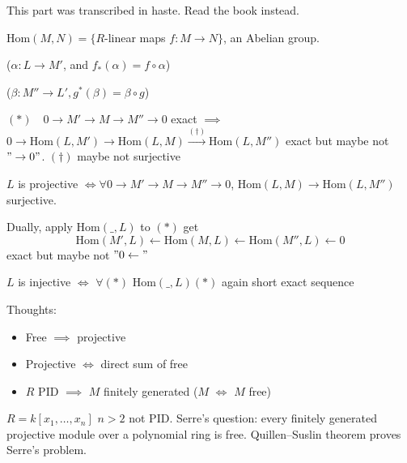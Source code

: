\documentclass{./template}
\newcommand{\Hom}{\textrm{Hom}}
\newcommand\xrsquigarrow[1]{%
    \mathrel{%
        \begin{tikzpicture}[%
            baseline={(current bounding box.south)}
            ]
        \node[%
            ,inner sep=.44ex
            ,align=center
            ] (tmp) {$\scriptstyle #1$};
        \path[%
            ,draw,<-
            ,decorate,decoration={%
                ,zigzag
                ,amplitude=0.7pt
                ,segment length=1.2mm,pre length=3.5pt
                }
            ] 
        (tmp.south east) -- (tmp.south west);
        \end{tikzpicture}
        }
    }
\begin{document}
  \hrulefill

  {\color{red} This part was transcribed in haste. Read the book instead.}

  $\Hom(M,N)=\{ R$-linear maps $f:M\to N\}$, an Abelian group.

  \begin{center}
  \end{center}

  
  \begin{center}
  ($\alpha : L\to M'$, and $f_*(\alpha)=f\circ \alpha$)
  \end{center}

  \begin{center}
  ($\beta:M''\to L', g^*(\beta)=\beta\circ g$)
  \end{center}


  $(*)\quad 0\to M' \to M\to M'' \to 0$ exact $\implies$ $0\to \Hom(L,M')\to\Hom(L,M)\xrightarrow {(\dagger)}\Hom(L,M'')$ exact but maybe not $"\rightarrow 0"$. $(\dagger)$ maybe not surjective

  { $L$ is projective $\iff \forall 0\to M'\to M\to M''\to 0$, $\Hom(L,M)\to \Hom(L,M'')$ surjective.}

  Dually, apply $\Hom(\_,L)$ to $(*)$ get
  $$\Hom(M',L)\leftarrow \Hom(M,L) \leftarrow \Hom(M'',L)\leftarrow 0$$
  exact but maybe not $"0\leftarrow"$

  { $L$ is injective $\iff$ $\forall (*)$ $\Hom(\_,L)(*)$ again short exact sequence}

  Thoughts:
  \begin{itemize}
    \item{Free $\implies$ projective}
    \item{Projective $\iff$ direct sum of free}
    \item{$R$ PID $\implies$ $M$ finitely generated ($M$  $\iff$ $M$ free)}
  \end{itemize}

  $R=k[x_1,\ldots,x_n]$ $n>2$ not PID. Serre's question: every finitely generated projective module over a polynomial ring is free. Quillen–Suslin theorem proves Serre's problem.
\end{document}
